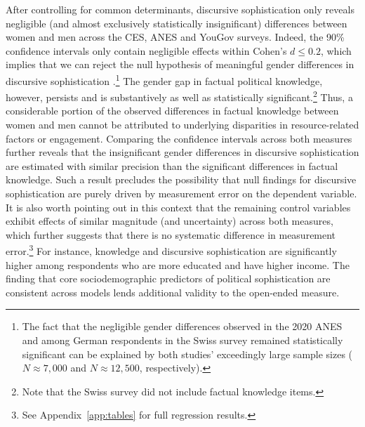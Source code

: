 After controlling for common determinants, discursive sophistication only reveals negligible (and almost exclusively statistically insignificant) differences between women and men across the CES, ANES and YouGov surveys. Indeed, the 90\% confidence intervals only contain negligible effects within Cohen's $d \leq 0.2$, which implies that we can reject the null hypothesis of meaningful gender differences in discursive sophistication \citep{rainey2014arguing}.\footnote{The fact that the negligible gender differences observed in the 2020 ANES and among German respondents in the Swiss survey remained statistically significant can be explained by both studies' exceedingly large sample sizes ($N\approx 7,000$ and $N\approx 12,500$, respectively).} The gender gap in factual political knowledge, however, persists and is substantively as well as statistically significant.\footnote{Note that the Swiss survey did not include factual knowledge items.} Thus, a considerable portion of the observed differences in factual knowledge between women and men cannot be attributed to underlying disparities in resource-related factors or engagement. Comparing the confidence intervals across both measures further reveals that the insignificant gender differences in discursive sophistication are estimated with similar precision than the significant differences in factual knowledge. Such a result precludes the possibility that null findings for discursive sophistication are purely driven by measurement error on the dependent variable. It is also worth pointing out in this context that the remaining control variables exhibit effects of similar magnitude (and uncertainty) across both measures, which further suggests that there is no systematic difference in measurement error.\footnote{See Appendix~\ref{app:tables} for full regression results.} For instance, knowledge and discursive sophistication are significantly higher among respondents who are more educated and have higher income. The finding that core sociodemographic predictors of political sophistication are consistent across models lends additional validity to the open-ended measure.

